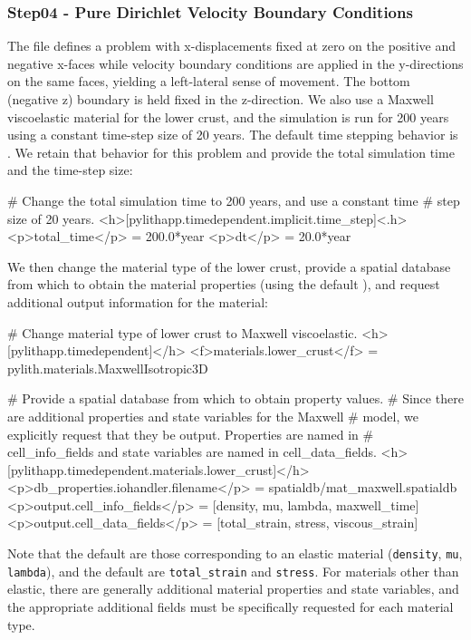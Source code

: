 \subsubsection{Step04 - Pure Dirichlet Velocity Boundary Conditions}

The  file defines a problem with x-displacements
fixed at zero on the positive and negative x-faces while velocity
boundary conditions are applied in the y-directions on the same faces,
yielding a left-lateral sense of movement. The bottom (negative z)
boundary is held fixed in the z-direction. We also use a Maxwell viscoelastic
material for the lower crust, and the simulation is run for 200 years
using a constant time-step size of 20 years. The default time stepping
behavior is . We retain that behavior for
this problem and provide the total simulation time and the time-step
size:
\begin{cfg}
# Change the total simulation time to 200 years, and use a constant time
# step size of 20 years.
<h>[pylithapp.timedependent.implicit.time_step]<.h>
<p>total_time</p> = 200.0*year
<p>dt</p> = 20.0*year 
\end{cfg}
We then change the material type of the lower crust, provide a spatial
database from which to obtain the material properties (using the default
), and request additional output information for
the material:
\begin{cfg}
# Change material type of lower crust to Maxwell viscoelastic.
<h>[pylithapp.timedependent]</h>
<f>materials.lower_crust</f> = pylith.materials.MaxwellIsotropic3D

# Provide a spatial database from which to obtain property values.
# Since there are additional properties and state variables for the Maxwell
# model, we explicitly request that they be output. Properties are named in
# cell_info_fields and state variables are named in cell_data_fields.
<h>[pylithapp.timedependent.materials.lower_crust]</h>
<p>db_properties.iohandler.filename</p> = spatialdb/mat_maxwell.spatialdb
<p>output.cell_info_fields</p> = [density, mu, lambda, maxwell_time]
<p>output.cell_data_fields</p> = [total_strain, stress, viscous_strain]
\end{cfg}
Note that the default  are those
corresponding to an elastic material (\texttt{density}, \texttt{mu},
\texttt{lambda}), and the default 
are \texttt{total\_strain} and \texttt{stress}. For materials other
than elastic, there are generally additional material properties and
state variables, and the appropriate additional fields must be specifically
requested for each material type.

